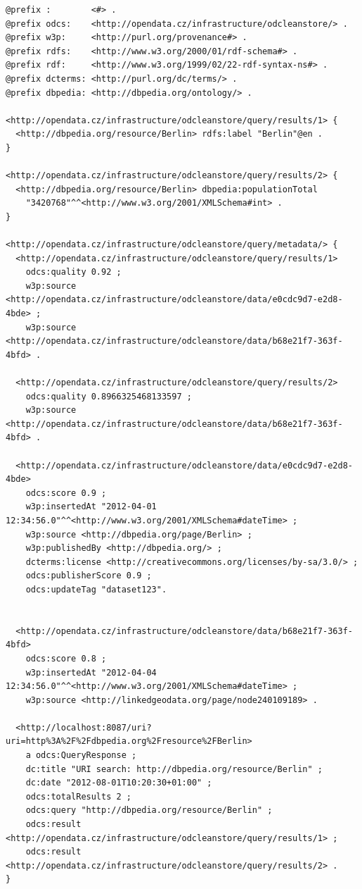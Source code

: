 \begin{lstlisting}[caption={Example of URI or keyword query response in TriG},label=lst:URIKWTrigResponse]
@prefix :        <#> .
@prefix odcs:    <http://opendata.cz/infrastructure/odcleanstore/> .
@prefix w3p:     <http://purl.org/provenance#> .
@prefix rdfs:    <http://www.w3.org/2000/01/rdf-schema#> .
@prefix rdf:     <http://www.w3.org/1999/02/22-rdf-syntax-ns#> .
@prefix dcterms: <http://purl.org/dc/terms/> .
@prefix dbpedia: <http://dbpedia.org/ontology/> .

<http://opendata.cz/infrastructure/odcleanstore/query/results/1> {
  <http://dbpedia.org/resource/Berlin> rdfs:label "Berlin"@en .
}

<http://opendata.cz/infrastructure/odcleanstore/query/results/2> {
  <http://dbpedia.org/resource/Berlin> dbpedia:populationTotal
    "3420768"^^<http://www.w3.org/2001/XMLSchema#int> .
}

<http://opendata.cz/infrastructure/odcleanstore/query/metadata/> {
  <http://opendata.cz/infrastructure/odcleanstore/query/results/1>
    odcs:quality 0.92 ;
    w3p:source <http://opendata.cz/infrastructure/odcleanstore/data/e0cdc9d7-e2d8-4bde> ;
    w3p:source <http://opendata.cz/infrastructure/odcleanstore/data/b68e21f7-363f-4bfd> .

  <http://opendata.cz/infrastructure/odcleanstore/query/results/2>
    odcs:quality 0.8966325468133597 ;
    w3p:source <http://opendata.cz/infrastructure/odcleanstore/data/b68e21f7-363f-4bfd> .

  <http://opendata.cz/infrastructure/odcleanstore/data/e0cdc9d7-e2d8-4bde>
    odcs:score 0.9 ;
    w3p:insertedAt "2012-04-01 12:34:56.0"^^<http://www.w3.org/2001/XMLSchema#dateTime> ;
    w3p:source <http://dbpedia.org/page/Berlin> ;
    w3p:publishedBy <http://dbpedia.org/> ;
    dcterms:license <http://creativecommons.org/licenses/by-sa/3.0/> ;
    odcs:publisherScore 0.9 ;
    odcs:updateTag "dataset123".
	

  <http://opendata.cz/infrastructure/odcleanstore/data/b68e21f7-363f-4bfd>
    odcs:score 0.8 ;
    w3p:insertedAt "2012-04-04 12:34:56.0"^^<http://www.w3.org/2001/XMLSchema#dateTime> ;
    w3p:source <http://linkedgeodata.org/page/node240109189> .

  <http://localhost:8087/uri?uri=http%3A%2F%2Fdbpedia.org%2Fresource%2FBerlin>
    a odcs:QueryResponse ;
    dc:title "URI search: http://dbpedia.org/resource/Berlin" ;
    dc:date "2012-08-01T10:20:30+01:00" ;
    odcs:totalResults 2 ;
    odcs:query "http://dbpedia.org/resource/Berlin" ;
    odcs:result <http://opendata.cz/infrastructure/odcleanstore/query/results/1> ;
    odcs:result <http://opendata.cz/infrastructure/odcleanstore/query/results/2> .
}
\end{lstlisting}

